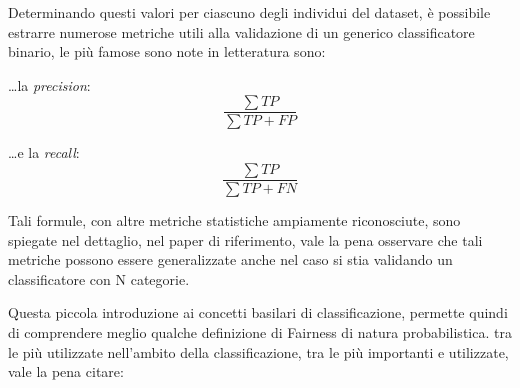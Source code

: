  Determinando questi valori per ciascuno degli individui del dataset, è possibile estrarre numerose metriche utili alla validazione di un generico classificatore binario, le più famose sono note in letteratura sono:
 
 \ldots la \emph{precision}:
\begin{equation*}
\frac{\sum{TP}}{\sum{TP + FP}}
\end{equation*}


 \ldots  e la \emph{recall}:
\begin{equation*}
\frac{\sum{TP}}{\sum{TP + FN}}
\end{equation*}

Tali formule, con altre metriche statistiche ampiamente riconosciute, sono spiegate nel dettaglio, nel paper  di riferimento\cite{FairnessDefinitionExplained}, vale la pena osservare che tali metriche possono essere generalizzate anche nel caso si stia validando un classificatore con N categorie.

Questa piccola introduzione ai concetti basilari di classificazione, permette quindi di comprendere meglio qualche definizione di Fairness di natura probabilistica.  tra le più utilizzate nell'ambito della classificazione, tra le più importanti e utilizzate, vale la pena citare\cite{FairnessDefinitionExplained}:

